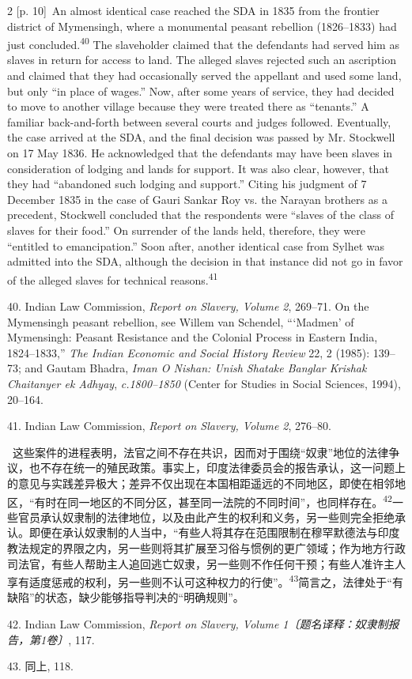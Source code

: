 \documentclass[10pt,a4paper]{article}
\begin{document}
\begin{paracol}{2}
{\scriptsize\color{gray} [p. 10]}\ An almost identical case reached the SDA in 1835 from the frontier district of Mymensingh, where a monumental peasant rebellion (1826–1833) had just concluded.\nobreak\textsuperscript{40} The slaveholder claimed that the defendants had served him as slaves in return for access to land. The alleged slaves rejected such an ascription and claimed that they had occasionally served the appellant and used some land, but only “in place of wages.” Now, after some years of service, they had decided to move to another village because they were treated there as “tenants.” A familiar back-and-forth between several courts and judges followed. Eventually, the case arrived at the SDA, and the final decision was passed by Mr. Stockwell on 17 May 1836. He acknowledged that the defendants may have been slaves in consideration of lodging and lands for support. It was also clear, however, that they had “abandoned such lodging and support.” Citing his judgment of 7 December 1835 in the case of Gauri Sankar Roy vs. the Narayan brothers as a precedent, Stockwell concluded that the respondents were “slaves of the class of slaves for their food.” On surrender of the lands held, therefore, they were “entitled to emancipation.” Soon after, another identical case from Sylhet was admitted into the SDA, although the decision in that instance did not go in favor of the alleged slaves for technical reasons.\nobreak\textsuperscript{41}\par{\small 40. Indian Law Commission, \textit{Report on Slavery, Volume 2}, 269–71. On the Mymensingh peasant rebellion, see Willem van Schendel, “‘Madmen’ of Mymensingh: Peasant Resistance and the Colonial Process in Eastern India, 1824–1833,” \textit{The Indian Economic and Social History Review} 22, 2 (1985): 139–73; and Gautam Bhadra, \textit{Iman O Nishan: Unish Shatake Banglar Krishak Chaitanyer ek Adhyay}, \textit{c.1800–1850} (Center for Studies in Social Sciences, 1994), 20–164.\par}{\small 41. Indian Law Commission, \textit{Report on Slavery, Volume 2}, 276–80.\par}
\switchcolumn*
{\scriptsize\color{gray} [p. 10]}\ 这些案件的进程表明，法官之间不存在共识，因而对于围绕“奴隶”地位的法律争议，也不存在统一的殖民政策。事实上，印度法律委员会的报告承认，这一问题上的意见与实践差异极大；差异不仅出现在本国相距遥远的不同地区，即使在相邻地区，“有时在同一地区的不同分区，甚至同一法院的不同时间”，也同样存\mbox{在。\textsuperscript{42}}一些官员承认奴隶制的法律地位，以及由此产生的权利和义务，另一些则完全拒绝承认。即便在承认奴隶制的人当中，“有些人将其存在范围限制在穆罕默德法与印度教法规定的界限之内，另一些则将其扩展至习俗与惯例的更广领域；作为地方行政司法官，有些人帮助主人追回逃亡奴隶，另一些则不作任何干预；有些人准许主人享有适度惩戒的权利，另一些则不认可这种权力的行使”。\nobreak\textsuperscript{43}简言之，法律处于“有缺陷”的状态，缺少能够指导判决的“明确规则”。\par{\small 42. Indian Law Commission, \textit{Report on Slavery, Volume 1〔题名译释：奴隶制报告，第1卷〕}, 117.\par}{\small 43. 同上, 118.\par}

\end{paracol}
\end{document}

